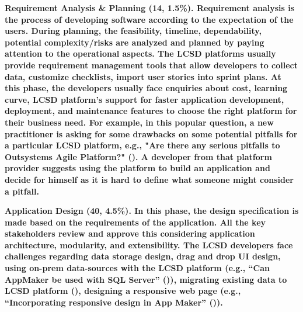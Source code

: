 \bf{Requirement Analysis \& Planning (14, 1.5\%).} 
Requirement analysis is the process of developing software according to the expectation of the users. 
During planning, the feasibility, timeline, dependability, potential complexity/risks are analyzed and planned by paying attention to the operational aspects. The LCSD platforms usually provide requirement management tools that allow developers to collect data, customize checklists, import user stories into sprint plans. At this phase, the developers usually face enquiries about cost, learning curve, LCSD platform's support for faster application development, deployment, and maintenance features to choose the right platform for their business need. For example, in this popular question, a new practitioner is asking for some drawbacks on some potential pitfalls for a particular LCSD platform, e.g., "Are there any serious pitfalls to Outsystems Agile Platform?" (). A developer from that platform provider suggests using the platform to build an application and decide for himself as it is hard to define what someone might consider a pitfall. 







\bf{Application Design (40, 4.5\%).} In this phase, the design specification is made based on the requirements of the application. All the key stakeholders review and approve this considering application architecture, modularity, and extensibility. The LCSD developers face challenges regarding data storage design, drag and drop UI design, using on-prem data-sources with the LCSD platform (e.g., ``Can AppMaker be used with SQL Server'' ()), migrating existing data to LCSD platform (), designing a responsive web page (e.g., ``Incorporating responsive design in App Maker'' ()).

